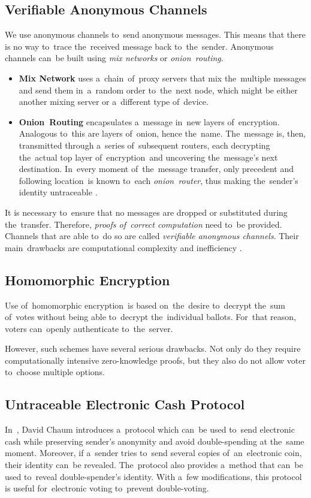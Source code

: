 \subsection{Verifiable Anonymous Channels}
We use anonymous channels to~send anonymous messages. This means that there is no way to~trace the~received message back to~the~sender. Anonymous channels can~be built using \emph{mix networks} or \emph{onion~routing}. 
\begin{itemize}
\item \textbf{Mix Network} uses a~chain~of~proxy servers that mix the~multiple messages and send them in~a~random order to~the~next node, which might be either another mixing server or a~different type of~device.
\item \textbf{Onion~Routing} encapsulates a~message in~new layers of~encryption. Analogous to~this are layers of~onion, hence the~name. The~message is, then, transmitted through a~series of~subsequent routers, each decrypting the~actual top layer of~encryption~and uncovering the~message's next destination. In~every moment of~the~message transfer, only precedent and following location~is known to~each \emph{onion~router}, thus making the~sender's identity untraceable \cite{Goldschlag}.
\end{itemize}

It is necessary to~ensure that no messages are dropped or substituted during the~transfer. Therefore, \emph{proofs of~correct computation} need to~be provided. Channels that are able to~do so are called \emph{verifiable anonymous channels}. Their main~drawbacks are computational complexity and inefficiency \cite{Haenni}.


\subsection{Homomorphic Encryption} 
Use of~homomorphic encryption~is based on~the~desire to~decrypt the~sum of~votes without being able to~decrypt the~individual ballots. For~that reason, voters can~openly authenticate to~the~server. 

However, such schemes have several serious drawbacks. Not only do they require computationally intensive zero-knowledge proofs, but they also do not allow voter to~choose multiple options.
\subsection{Untraceable Electronic Cash Protocol}
In~\cite{Chaum}, David Chaum introduces a~protocol which can~be used to~send electronic cash while preserving sender's anonymity and avoid double-spending at the~same moment. Moreover, if a~sender tries to~send several copies of~an~electronic coin, their identity can~be revealed. The~protocol also provides a~method that can~be used to~reveal double-spender's identity. With a~few modifications, this protocol is useful for~electronic voting to~prevent double-voting. %

